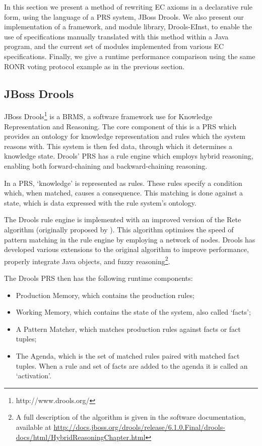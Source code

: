 In this section we present a method of rewriting \ac{EC} axioms in a
declarative rule form, using the language of a \acl{PRS} system, JBoss Drools.
We also present our implementation of a framework, and module library, 
Drools-EInst, to enable the use of specifications manually translated with this method within
a Java program, and the current set of modules implemented from various
\ac{EC} specifications. Finally, we give a runtime performance comparison
using the same \ac{RONR} voting protocol example as in the previous section.

\subsection{JBoss Drools}

JBoss Drools\footnote{http://www.drools.org/} is a \ac{BRMS}, a software framework use for Knowledge
Representation and Reasoning. The core component of this is a \ac{PRS}
which provides an ontology for knowledge representation and rules which the system
reasons with. This system is then fed data, through which it determines a
knowledge state. Drools' \ac{PRS} has a rule engine which employs hybrid reasoning,
enabling both forward-chaining and backward-chaining reasoning.

In a \ac{PRS}, `knowledge' is represented as rules. These rules specify a
condition which, when matched, causes a consequence. This matching is done
against a state, which is data expressed with the rule system's ontology. 

The Drools rule engine is implemented with an improved version of the Rete
algorithm (originally proposed by \citet{Forgy1982}). This algorithm optimises
the speed of pattern matching in the rule engine by employing a network of
nodes. Drools has developed various extensions to the original algorithm to
improve performance, properly integrate Java objects, and fuzzy reasoning\footnote{A full description of the algorithm is given in the software
documentation, available at \url{http://docs.jboss.org/drools/release/6.1.0.Final/drools-docs/html/HybridReasoningChapter.html}}.

The Drools \ac{PRS} then has the following runtime components:
\begin{itemize}
	\item Production Memory, which contains the production rules;
	\item Working Memory, which contains the state of the system, also called `facts';
	\item A Pattern Matcher, which matches production rules against facts or fact
	tuples;
	\item The Agenda, which is the set of matched rules paired with matched fact
	tuples. When a rule and set of facts are added to the agenda it is called an `activation'.
\end{itemize}

